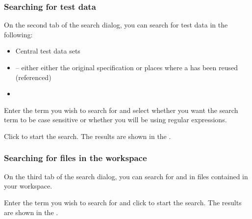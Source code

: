 
\subsubsection{Searching for test data}
\label{TasksSearchData}

On the second tab of the search dialog, you can search for test data in the following:

\begin{itemize}
\item Central test data sets
\item \gdcases{} -- either either the original specification or places where a \gdcase{} has been reused (referenced)
\item \gdsteps{}
\end{itemize}


Enter the term you wish to search for and select whether you want the search term to be case sensitive or whether you will be using regular expressions. 

Click  to start the search. The results are shown in the \gdsearchresultview{} . 


\subsubsection{Searching for files in the workspace}
\label{TasksSearchFiles}

On the third tab of the search dialog, you can search for and in files contained in your workspace.

Enter the term you wish to search for and click  to start the search. The results are shown in the \gdsearchresultview{} . 


